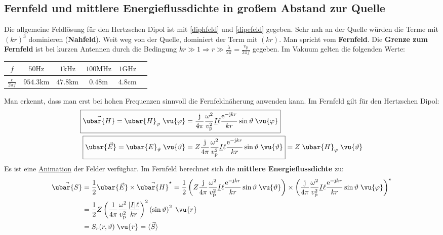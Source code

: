   \subsection{Fernfeld und mittlere Energieflussdichte in großem Abstand zur Quelle}
Die allgemeine Feldlösung für den Hertzschen Dipol ist mit \ref{diphfeld} und \ref{dipefeld} gegeben. Sehr nah an der Quelle würden die Terme mit $(kr)^3$ dominieren (\textbf{Nahfeld}). Weit weg von der Quelle, dominiert der Term mit $(kr)$. Man spricht vom \textbf{Fernfeld}. Die \textbf{Grenze zum Fernfeld} ist bei kurzen Antennen durch die Bedingung \( k r \gg 1 \Rightarrow r \gg  \frac{\lambda}{2\pi} = \frac{ v_\mathrm{p}}{2\pi f}\) gegeben. Im Vakuum gelten die folgenden Werte:
\begin{center}
	\begin{tabular}{c||c|c|c|c|c}
		$f$                & $50\mathrm{Hz}$      & $1\mathrm{kHz}$   & $100\mathrm{MHz}$ & $1\mathrm{GHz}$  \\
		\hline
		$\frac{c}{2\pi f}$ & ${954.3}\mathrm{km}$ & $47.8\mathrm{km}$ & $0.48\mathrm{m}$  & $4.8\mathrm{cm}$
	\end{tabular}
\end{center}
Man erkennt, dass man erst bei hohen Frequenzen sinnvoll die Fernfeldnäherung anwenden kann. Im Fernfeld gilt für den Hertzschen Dipol:
		        \begin{align}
			        \Aboxed{\vec{\ubar{H}}= \ubar{H}_\varphi \; \vu{\varphi} =      & \frac{\mathrm{j}}{4\pi} \frac{\omega^2}{ v_\mathrm{p}^2}\underline{I} \ell  \frac{ \mathrm{e}^{-\mathrm{j} kr}}{ kr} \sin\vartheta \; \vu{\varphi}}                                             \\
			        \Aboxed{\ubar{\vec{E}} = \ubar{E}_\vartheta \; \vu{\vartheta} = & Z \frac{\mathrm{j}}{4\pi} \frac{\omega^2}{ v_\mathrm{p}^2}\underline{I} \ell  \frac{ \mathrm{e}^{-\mathrm{j} kr}}{ kr} \sin\vartheta\; \vu{\vartheta}} = Z\; \ubar{H}_\varphi \; \vu{\vartheta}
		        \end{align}
		   Es ist eine \href{https://www.didaktikonline.physik.uni-muenchen.de/programme/dipolstr/Dipolstr_leifi.html}{Animation} der Felder verfügbar.
	 Im Fernfeld berechnet sich die \textbf{mittlere Energieflussdichte} zu:
		        \begin{equation}\begin{split}
				        \vec{\ubar{S}} &= \frac{1}{2} \ubar{\vec{E}} \times \vec{\ubar{H}}^\star = \frac{1}{2} \left( Z \frac{\mathrm{j}}{4\pi} \frac{\omega^2}{ v_\mathrm{p}^2}\underline{I} \ell  \frac{ \mathrm{e}^{-\mathrm{j} kr}}{ kr} \sin\vartheta\; \vu{\vartheta} \right) \times \left(\frac{\mathrm{j}}{4\pi} \frac{\omega^2}{ v_\mathrm{p}^2}\underline{I} \ell  \frac{ \mathrm{e}^{-\mathrm{j} kr}}{ kr} \sin\vartheta \; \vu{\varphi} \right)^\star\\
				        &= \frac{1}{2} Z \left( \frac{1}{4\pi} \frac{\omega^2}{ v_\mathrm{p}^2}\frac{|\underline{I}| \ell}{ kr} \right)^2 \left(\sin\vartheta\right)^2 \; \vu{r}  \\
				        & = S_r(r,\vartheta) \; \vu{r} = \langle \vec{S} \rangle
			        \end{split}\end{equation}
